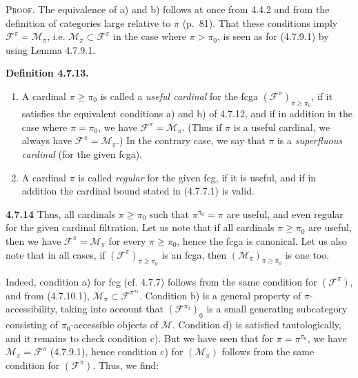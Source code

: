 \textsc{Proof}. The equivalence of a) and b) follows at once from 4.4.2 and from the definition of categories large relative to $\pi$ (p.~81). That these
conditions imply $\mathcal{F}^{\pi}=\mathcal{M}_\pi$, i.e. $\mathcal{M}_\pi\subset\mathcal{F}^{\pi}$ in the case where $\pi>\pi_0$, is seen as for (4.7.9.1) by using Lemma 4.7.9.1.

\textbf{Definition 4.7.13.}
\begin{enumerate}[label={$\arabic*^{\circ}$)}]
\item A cardinal $\pi\geqslant\pi_0$ is called a \textit{useful cardinal} for the fcga $(\mathcal{F}^{\pi})_{\pi\geqslant\pi_0}$, if it satisfies the equivalent conditions a) and b) of 4.7.12, and if in addition in the case where $\pi=\pi_0$, we have $\mathcal{F}^{\pi}=\mathcal{M}_\pi$. (Thus if $\pi$ is a useful cardinal, we always have $\mathcal{F}^{\pi}=\mathcal{M}_\pi$.) In the contrary case, we say that $\pi$ is a \textit{superfluous cardinal} (for the given fcga). %
\item A cardinal $\pi$ is called \textit{regular} for the given fcg, if it is useful, and if in addition the cardinal bound stated in (4.7.7.1) is valid.
\end{enumerate}

\textbf{4.7.14} Thus, all cardinals $\pi\geqslant\pi_0$ such that $\pi^{\pi_0}=\pi$ are useful, and even regular for the given cardinal filtration. Let us note that if all cardinals $\pi\geqslant\pi_0$ are useful, then we have $\mathcal{F}^{\pi}=\mathcal{M}_\pi$ for every $\pi\geqslant\pi_0$, hence the fcga is canonical. Let us also note that in all cases, if $(\mathcal{F}^{\pi})_{\pi\geqslant\pi_0}$ is an fcga, then $(\mathcal{M}_\pi)_{\pi\geqslant\pi_0}$ is one too.

\noindent{}Indeed, condition a) for fcg (cf. 4.7.7) follows from the same condition for $(\mathcal{F}^{\pi})$, and from (4.7.10.1), $\mathcal{M}_\pi\subset\mathcal{F}^{\pi^{\pi_0}}$. Condition b) is a general property of $\pi$-accessibility, taking into account that $(\mathcal{F}^{\pi_0})_0$ is a small generating subcategory consisting of $\pi_0$-accessible objects of $\mathcal{M}$. Condition d) is satisfied tautologically, and it remains to check condition c). But we have seen that for $\pi=\pi^{\pi_0}$, we have $\mathcal{M}_\pi=\mathcal{F}^{\pi}$ (4.7.9.1), hence condition c) for $(\mathcal{M}_\pi)$ follows from the same condition for $(\mathcal{F}^{\pi})$. Thus, we find:

